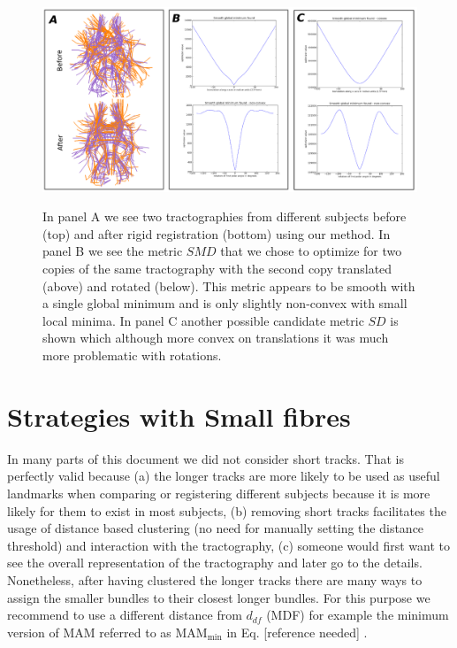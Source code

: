 \documentclass[preprint,authoryear,a4paper,10pt,onecolumn]{elsarticle}
\begin{document}
%
\begin{figure}
\begin{centering}
\label{Flo:direct_registration}\includegraphics[scale=0.8]{last_figures/LSC_registration2}
\par\end{centering}

\caption{In panel A we see two tractographies from different subjects
  before (top) and after rigid registration (bottom) using our
  method. In panel B we see the metric $SMD$ that we chose to optimize
  for two copies of the same tractography with the second copy
  translated (above) and rotated (below). This metric appears to be
  smooth with a single global minimum and is only slightly non-convex
  with small local minima. In panel C another possible candidate metric
  $SD$ is shown which although more convex on translations it was much
  more problematic with rotations.}

\end{figure}

\section{Strategies with Small fibres}

In many parts of this document we did not consider short tracks. That
is perfectly valid because (a) the longer tracks are more likely to
be used as useful landmarks when comparing or registering different
subjects because it is more likely for them to exist in most subjects,
(b) removing short tracks facilitates the usage of distance based
clustering (no need for manually setting the distance threshold) and
interaction with the tractography, (c) someone would first want to
see the overall representation of the tractography and later go to
the details. Nonetheless, after having clustered the longer tracks
there are many ways to assign the smaller bundles to their closest
longer bundles. For this purpose we recommend to use a different distance
from $d_{df}$ (MDF) for example the minimum version of MAM referred
to as $\textrm{MAM}_{\textrm{min}}$ in Eq. [reference needed]
. 
\end{document}
